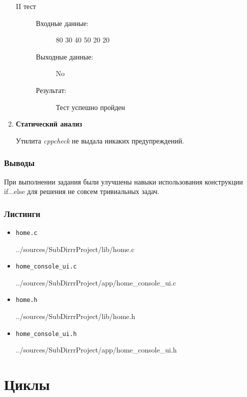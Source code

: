 \documentclass[12pt,a4paper]{report}
\begin{document}
\begin{enumerate}
\begin{description}
\item[II тест]
\hspace{\parindent}
\begin{flushleft}
\begin{description}
\item[Входные данные:] 80 30 40 50 20 20 
\item[Выходные данные:] No
\item[Результат:] Тест успешно пройден
\end{description}
\end{flushleft}
\end{description}
\item \textbf{Статический анализ}

\hspace{\parindent} 
Утилита \textit{cppcheck} не выдала никаких предупреждений.
\end{enumerate}



\subsection{Выводы}
\hspace{\parindent} 
При выполнении задания были улучшены навыки использования конструкции if...else для решения не совсем тривиальных задач.

\subsection*{Листинги}
\begin{itemize}
\item[] \verb-home.c-

{../sources/SubDirrrProject/lib/home.c}
\item[] \verb-home_console_ui.c-

{../sources/SubDirrrProject/app/home_console_ui.c}
\item[] \verb-home.h-

{../sources/SubDirrrProject/lib/home.h}
\item[] \verb-home_console_ui.h-

{../sources/SubDirrrProject/app/home_console_ui.h}
\end{itemize}
%
\chapter{Циклы}
\end{document}
